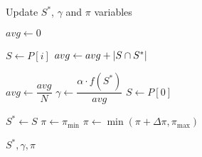 \begin{algorithm}[h]
  \caption{Update $S^{*}$, $\gamma$ and $\pi$ variables}\label{alg:GENETIKUS-ALGORITMUS:UPDATE}
  \begin{algorithmic}[1]
    \State $avg \leftarrow 0$

    \State $S \leftarrow P\left[ i \right]$
    \State $avg \leftarrow avg + \lvert S \cap S^{*}\rvert$
    \EndFor

    \State $avg \leftarrow \dfrac{avg}{N}$
    \State $\gamma \leftarrow \dfrac{\alpha \cdot f(S^{*})}{avg}$
    \State $S \leftarrow P\left[ 0 \right]$

    \State $S^{*} \leftarrow S$
    \State $\pi \leftarrow \pi_{\min}$
    \Else
    \State $\pi \leftarrow \min(\pi + \Delta \pi, \pi_{\max})$
    \EndIf

    \State \Return $S^{*}, \gamma, \pi$
    \EndFunction
  \end{algorithmic}
\end{algorithm}
